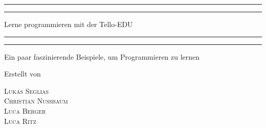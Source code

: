 \begin{titlepage} %

	\centering %

	\scshape %

	\vspace*{\baselineskip} %


	\rule{\textwidth}{1.6pt}\vspace*{-\baselineskip}\vspace*{2pt} %
	\rule{\textwidth}{0.4pt} %

	\vspace{0.75\baselineskip} %

	{\LARGE Lerne programmieren mit der Tello-EDU \\} %

	\vspace{0.75\baselineskip} %

	\rule{\textwidth}{0.4pt}\vspace*{-\baselineskip}\vspace{3.2pt} %
	\rule{\textwidth}{1.6pt} %

	\vspace{2\baselineskip} %


	Ein paar faszinierende Beispiele, um Programmieren zu lernen %

	\vspace*{3\baselineskip} %


	Erstellt von

	\vspace{0.5\baselineskip} %

	{\scshape\Large Lukas Seglias \\ Christian Nussbaum \\ Luca Berger \\ Luca Ritz \\} %


\end{titlepage}
